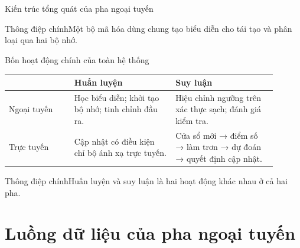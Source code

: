\documentclass[aspectratio=169]{beamer}
\newcommand{\takeaway}[1]{\begin{alertblock}{Thông điệp chính}#1\end{alertblock}}
\begin{document}
\begin{frame}{Kiến trúc tổng quát của pha ngoại tuyến}
  \begin{center}
    
  \end{center}
  \takeaway{Một bộ mã hóa dùng chung tạo biểu diễn cho tái tạo và phân loại qua hai bộ nhớ.}
\end{frame}

\begin{frame}{Bốn hoạt động chính của toàn hệ thống}
  \small
  \begin{tabular}{>{\raggedright\arraybackslash}p{0.22\linewidth} p{0.34\linewidth} p{0.34\linewidth}}
    \toprule
    & Huấn luyện & Suy luận \\
    \midrule
    Ngoại tuyến & Học biểu diễn; khởi tạo bộ nhớ; tinh chỉnh đầu ra. & Hiệu chỉnh ngưỡng trên xác thực sạch; đánh giá kiểm tra. \\
    Trực tuyến & Cập nhật có điều kiện chỉ bộ ánh xạ trực tuyến. & Cửa sổ mới → điểm số → làm trơn → dự đoán → quyết định cập nhật. \\
    \bottomrule
  \end{tabular}
  \takeaway{Huấn luyện và suy luận là hai hoạt động khác nhau ở cả hai pha.}
\end{frame}

\section{Luồng dữ liệu của pha ngoại tuyến}
\end{document}
